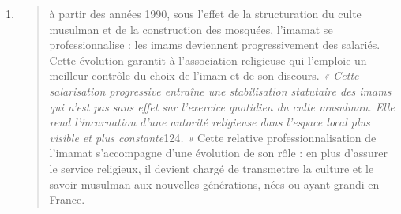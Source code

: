 \begin{enumerate}
\def\labelenumi{\arabic{enumi}.}
\setcounter{enumi}{2}
\item
  \begin{quote}
  à partir des années 1990, sous l'effet de la structuration du culte
  musulman et de la construction des mosquées, l'imamat se
  professionnalise : les imams deviennent progressivement des salariés.
  Cette évolution garantit à l'association religieuse qui l'emploie un
  meilleur contrôle du choix de l'imam et de son discours. \emph{« Cette
  salarisation progressive entraîne une stabilisation statutaire des
  imams qui n'est pas sans effet sur l'exercice quotidien du culte
  musulman. Elle rend l'incarnation d'une autorité religieuse dans
  l'espace local plus visible et plus constante}124\emph{. »} Cette
  relative professionnalisation de l'imamat s'accompagne d'une évolution
  de son rôle : en plus d'assurer le service religieux, il devient
  chargé de transmettre la culture et le savoir musulman aux nouvelles
  générations, nées ou ayant grandi en France.
  \end{quote}
\end{enumerate}

